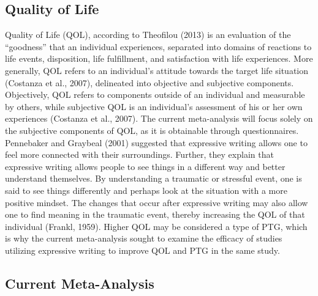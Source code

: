 \documentclass[man, mask]{apa6}
\theoremstyle{definition}
\theoremstyle{definition}
\theoremstyle{definition}
\theoremstyle{remark}
\begin{document}
\subsection{Quality of Life}\label{quality-of-life}

Quality of Life (QOL), according to Theofilou (2013) is an evaluation of
the \enquote{goodness} that an individual experiences, separated into
domains of reactions to life events, disposition, life fulfillment, and
satisfaction with life experiences. More generally, QOL refers to an
individual's attitude towards the target life situation (Costanza et
al., 2007), delineated into objective and subjective components.
Objectively, QOL refers to components outside of an individual and
measurable by others, while subjective QOL is an individual's assessment
of his or her own experiences (Costanza et al., 2007). The current
meta-analysis will focus solely on the subjective components of QOL, as
it is obtainable through questionnaires. Pennebaker and Graybeal (2001)
suggested that expressive writing allows one to feel more connected with
their surroundings. Further, they explain that expressive writing allows
people to see things in a different way and better understand
themselves. By understanding a traumatic or stressful event, one is said
to see things differently and perhaps look at the situation with a more
positive mindset. The changes that occur after expressive writing may
also allow one to find meaning in the traumatic event, thereby
increasing the QOL of that individual (Frankl, 1959). Higher QOL may be
considered a type of PTG, which is why the current meta-analysis sought
to examine the efficacy of studies utilizing expressive writing to
improve QOL and PTG in the same study.

\subsection{Current Meta-Analysis}\label{current-meta-analysis}
\end{document}
